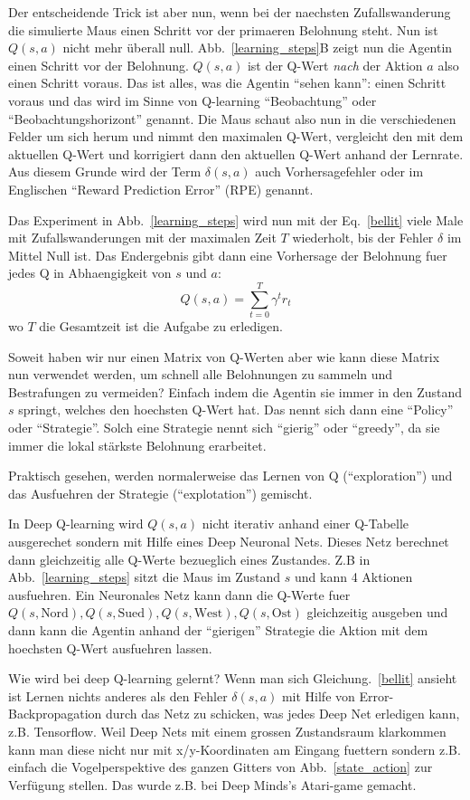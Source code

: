 \documentclass[12pt]{report}
\begin{document}
Der entscheidende Trick ist aber nun, wenn bei der naechsten
Zufallswanderung die simulierte Maus einen Schritt vor der primaeren
Belohnung steht. Nun ist $Q(s,a)$ nicht mehr überall
null. Abb.~\ref{learning_steps}B zeigt nun die Agentin einen Schritt
vor der Belohnung. $Q(s,a)$ ist der Q-Wert \textsl{nach} der Aktion
$a$ also einen Schritt voraus. Das ist alles, was die Agentin ``sehen
kann'': einen Schritt voraus und das wird im Sinne von Q-learning
``Beobachtung'' oder ``Beobachtungshorizont'' genannt. Die Maus schaut
also nun in die verschiedenen Felder um sich herum und nimmt den
maximalen Q-Wert, vergleicht den mit dem aktuellen Q-Wert und
korrigiert dann den aktuellen Q-Wert anhand der Lernrate. Aus diesem
Grunde wird der Term $\delta(s,a)$ auch Vorhersagefehler oder im
Englischen ``Reward Prediction Error'' (RPE) genannt.

Das Experiment in Abb.~\ref{learning_steps} wird nun mit der
Eq.~\ref{bellit} viele Male mit Zufallswanderungen mit der maximalen
Zeit $T$ wiederholt, bis der Fehler $\delta$ im Mittel Null
ist. Das Endergebnis gibt dann eine Vorhersage der
Belohnung fuer jedes Q in Abhaengigkeit von $s$ und $a$:
\begin{equation}
  Q(s,a) = \sum_{t=0}^T \gamma^t r_t
\end{equation}
wo $T$ die Gesamtzeit ist die Aufgabe zu erledigen.

Soweit haben wir nur einen Matrix von Q-Werten aber wie kann diese
Matrix nun verwendet werden, um schnell alle Belohnungen zu sammeln
und Bestrafungen zu vermeiden? Einfach indem die Agentin sie immer in
den Zustand $s$ springt, welches den hoechsten Q-Wert hat. Das nennt
sich dann eine ``Policy'' oder ``Strategie''. Solch eine Strategie
nennt sich ``gierig'' oder ``greedy'', da sie immer die lokal stärkste
Belohnung erarbeitet.

Praktisch gesehen, werden normalerweise das Lernen von Q
(``exploration'') und das Ausfuehren der Strategie (``explotation'')
gemischt.

In Deep Q-learning wird $Q(s,a)$ nicht iterativ anhand einer Q-Tabelle
ausgerechet sondern mit Hilfe eines Deep Neuronal Nets. Dieses Netz
berechnet dann gleichzeitig alle Q-Werte bezueglich eines
Zustandes. Z.B in Abb.~\ref{learning_steps} sitzt die Maus im Zustand
$s$ und kann 4 Aktionen ausfuehren. Ein Neuronales Netz kann dann die
Q-Werte fuer $Q(s,\textrm{Nord}), Q(s,\textrm{Sued}),
Q(s,\textrm{West}), Q(s,\textrm{Ost})$ gleichzeitig ausgeben und dann
kann die Agentin anhand der ``gierigen'' Strategie die Aktion mit dem
hoechsten Q-Wert ausfuehren lassen.

Wie wird bei deep Q-learning gelernt? Wenn man sich
Gleichung.~\ref{bellit} ansieht ist Lernen nichts anderes als den
Fehler $\delta(s,a)$ mit Hilfe von Error-Backpropagation durch das
Netz zu schicken, was jedes Deep Net erledigen kann,
z.B. Tensorflow. Weil Deep Nets mit einem grossen Zustandsraum
klarkommen kann man diese nicht nur mit x/y-Koordinaten am Eingang
fuettern sondern z.B. einfach die Vogelperspektive des ganzen Gitters
von Abb.~\ref{state_action} zur Verfügung stellen. Das wurde z.B. bei
Deep Minds's Atari-game gemacht.
\end{document}
